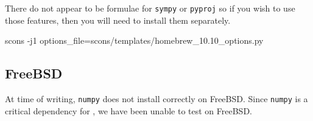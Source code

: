 There do not appear to be formulae for \texttt{sympy} or \texttt{pyproj} so if you wish to use those features, then
you will need to install them separately.


\begin{shellCode}
scons -j1 options_file=scons/templates/homebrew_10.10_options.py
\end{shellCode}


\subsection{FreeBSD}\label{sec:freebsdsrc}

At time of writing, \texttt{numpy} does not install correctly on FreeBSD.
Since \texttt{numpy} is a critical dependency for \escript, we have been unable to test on FreeBSD.

\begin{comment}
\subsubsection{Release 10.0}

Install the following packages:
\begin{itemize}
 \item python
 \item scons
 \item boost-python-libs
 \item bash
 \item netcdf
 \item silo
 \item py27-scipy
 \item py27-gdal
 \item py27-matplotlib
 \item py27-pyproj
 \item py27-sympy
\end{itemize}

\noindent Next choose (or create) your options file.
For the setup as above the escript source comes with a prepared file in
\texttt{scons/templates/freebsd10.0_options.py}.
Finally to build escript issue the following in the escript source directory
(replace the options file as required):
\begin{shellCode}
scons -j1 options_file=scons/templates/freebsd10.0_options.py
\end{shellCode}

\emph{Note:} Some packages installed above are built with gcc 4.7. Somewhere
in the toolchain a system-installed gcc library is pulled in which is
incompatible with the one from version 4.7 and would prevent escript from
executing successfully. As explained in the FreeBSD
documentation\footnote{see \url{http://www.freebsd.org/doc/en/articles/custom-gcc/article.html}}
this can be fixed by adding a line to \texttt{/etc/libmap.conf}:
\begin{shellCode}
libgcc_s.so.1 gcc47/libgcc_s.so.1
\end{shellCode}

\end{comment}

